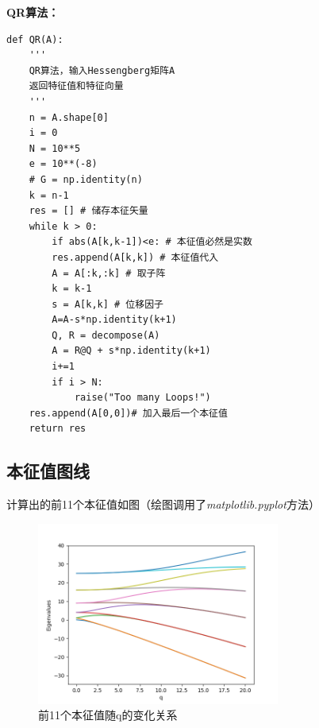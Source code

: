 \documentclass[a4paper]{ctexart}
\begin{document}
\textbf{QR算法：}
\begin{lstlisting}
def QR(A):
	'''
	QR算法，输入Hessengberg矩阵A
	返回特征值和特征向量
	'''
	n = A.shape[0]
	i = 0
	N = 10**5
	e = 10**(-8)
	# G = np.identity(n)
	k = n-1
	res = [] # 储存本征矢量
	while k > 0:
		if abs(A[k,k-1])<e: # 本征值必然是实数
		res.append(A[k,k]) # 本征值代入
		A = A[:k,:k] # 取子阵
		k = k-1
		s = A[k,k] # 位移因子
		A=A-s*np.identity(k+1)
		Q, R = decompose(A)
		A = R@Q + s*np.identity(k+1)
		i+=1
		if i > N: 
			raise("Too many Loops!")
	res.append(A[0,0])# 加入最后一个本征值
	return res
\end{lstlisting}
\subsection{本征值图线}
计算出的前11个本征值如图（绘图调用了\textit{matplotlib.pyplot}方法）
\begin{figure}[hbt]
	\centering
	\includegraphics[width=8cm]{./fig/eigen_1.png}
	\caption{前11个本征值随q的变化关系}
\end{figure}
\end{document}
